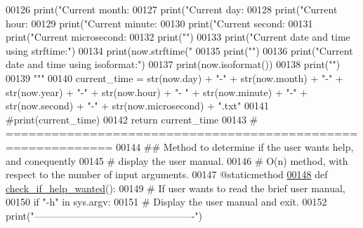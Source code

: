 \begin{DoxyCode}
{00126 \textcolor{stringliteral}{        print("Current month: %
00127 \textcolor{stringliteral}{        print("Current day: %
00128 \textcolor{stringliteral}{        print("Current hour: %
00129 \textcolor{stringliteral}{        print("Current minute: %
00130 \textcolor{stringliteral}{        print("Current second: %
00131 \textcolor{stringliteral}{        print("Current microsecond: %
00132 \textcolor{stringliteral}{        print("")}
00133 \textcolor{stringliteral}{        print("Current date and time using strftime:")}
00134 \textcolor{stringliteral}{        print(now.strftime("%
00135 \textcolor{stringliteral}{        print("")}
00136 \textcolor{stringliteral}{        print("Current date and time using isoformat:")}
00137 \textcolor{stringliteral}{        print(now.isoformat())}
00138 \textcolor{stringliteral}{        print("")}
00139 \textcolor{stringliteral}{        """}
00140         current\_time = str(now.day) + \textcolor{stringliteral}{"-"} + str(now.month) + \textcolor{stringliteral}{"-"} + str(now.year) + \textcolor{stringliteral}{"-"} + str(now.hour) + \textcolor{stringliteral}{"-
      "}  + str(now.minute) + \textcolor{stringliteral}{"-"}  + str(now.second) + \textcolor{stringliteral}{"-"}  + str(now.microsecond) + \textcolor{stringliteral}{".txt"}
00141         \textcolor{comment}{#print(current\_time)}
00142         \textcolor{keywordflow}{return} current\_time
00143     \textcolor{comment}{# ============================================================}
00144     \textcolor{comment}{##  Method to determine if the user wants help, and conequently}
00145     \textcolor{comment}{#       display the user manual.}
00146     \textcolor{comment}{#   O(n) method, with respect to the number of input arguments.}
00147     @staticmethod
\hypertarget{generate__results__filename_8py_source_l00148}{}\hyperlink{classutilities_1_1generate__results__filename_1_1generate__filename_a9ea9390694e2e9707784bd8f7e8b2373}{00148}     \textcolor{keyword}{def }\hyperlink{classutilities_1_1generate__results__filename_1_1generate__filename_a9ea9390694e2e9707784bd8f7e8b2373}{check\_if\_help\_wanted}():
00149         \textcolor{comment}{# If user wants to read the brief user manual,}
00150         \textcolor{keywordflow}{if} \textcolor{stringliteral}{"-h"} \textcolor{keywordflow}{in} sys.argv:
00151             \textcolor{comment}{# Display the user manual and exit.}
00152             print(\textcolor{stringliteral}{"-------------------------------------------------"})
}}}}}}}}
\end{DoxyCode}
